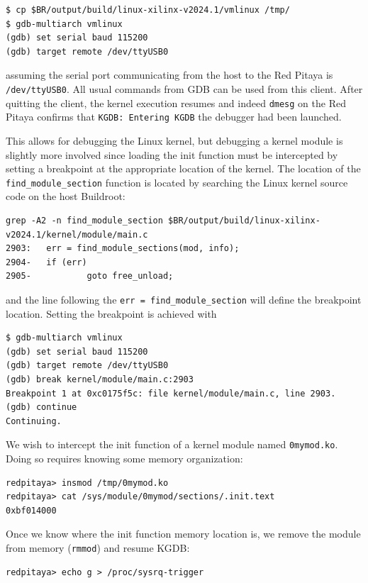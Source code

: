 \documentclass{article}
\begin{document}
{{{\begin{verbatim}
$ cp $BR/output/build/linux-xilinx-v2024.1/vmlinux /tmp/
$ gdb-multiarch vmlinux
(gdb) set serial baud 115200
(gdb) target remote /dev/ttyUSB0
\end{verbatim}

\noindent assuming the serial port communicating from the host to the Red Pitaya is {\tt /dev/ttyUSB0}.
All usual commands from GDB can be used from this client. After quitting the client, the kernel execution
resumes and indeed {\tt dmesg} on the Red Pitaya confirms that {\tt KGDB: Entering KGDB} the debugger
had been launched.

This allows for debugging the Linux kernel, but debugging a kernel module is slightly more involved since
loading the init function must be intercepted by setting a breakpoint at the appropriate location of 
the kernel. The location of the {\tt find\_module\_section} function is located by searching the Linux
kernel source code on the host Buildroot:

\noindent
\begin{verbatim}
grep -A2 -n find_module_section $BR/output/build/linux-xilinx-v2024.1/kernel/module/main.c 
2903:   err = find_module_sections(mod, info);
2904-   if (err)
2905-           goto free_unload;
\end{verbatim}

\noindent and the line following the {\tt err = find\_module\_section} will define the breakpoint location. Setting the
breakpoint is achieved with

\begin{verbatim}
$ gdb-multiarch vmlinux 
(gdb) set serial baud 115200
(gdb) target remote /dev/ttyUSB0
(gdb) break kernel/module/main.c:2903
Breakpoint 1 at 0xc0175f5c: file kernel/module/main.c, line 2903.
(gdb) continue
Continuing.
\end{verbatim}

We wish to intercept the init function of a kernel module named {\tt 0mymod.ko}. Doing so requires knowing some
memory organization:

\begin{verbatim}
redpitaya> insmod /tmp/0mymod.ko 
redpitaya> cat /sys/module/0mymod/sections/.init.text 
0xbf014000
\end{verbatim}

Once we know where the init function memory location is, we remove the module from memory ({\tt rmmod}) and resume
KGDB:

\begin{verbatim}
redpitaya> echo g > /proc/sysrq-trigger 
\end{verbatim}

}}}
\end{document}
